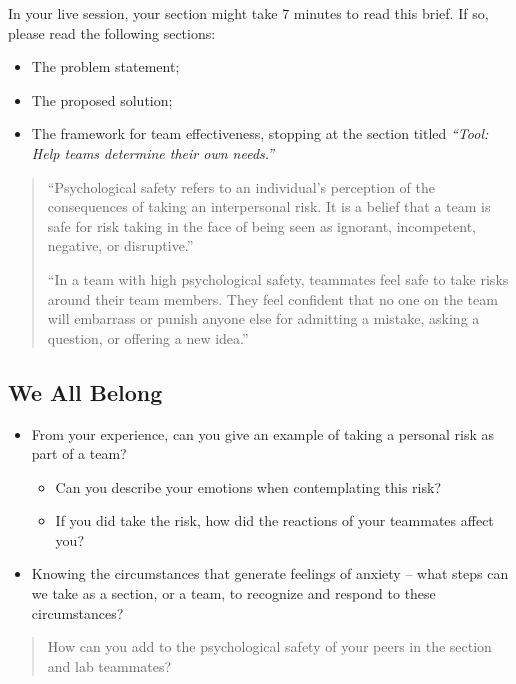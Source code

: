 \documentclass[
]{book}
\providecommand{\tightlist}{%
  \setlength{\itemsep}{0pt}\setlength{\parskip}{0pt}}
\theoremstyle{definition}
\theoremstyle{definition}
\theoremstyle{definition}
\theoremstyle{definition}
\theoremstyle{remark}
\begin{document}
In your live session, your section might take 7 minutes to read this brief. If so, please read the following sections:

\begin{itemize}
\tightlist
\item
  The problem statement;
\item
  The proposed solution;
\item
  The framework for team effectiveness, stopping at the section titled \emph{``Tool: Help teams determine their own needs.''}
\end{itemize}

\begin{quote}
``Psychological safety refers to an individual's perception of the consequences of taking an interpersonal risk. It is a belief that a team is safe for risk taking in the face of being seen as ignorant, incompetent, negative, or disruptive.''

``In a team with high psychological safety, teammates feel safe to take risks around their team members. They feel confident that no one on the team will embarrass or punish anyone else for admitting a mistake, asking a question, or offering a new idea.''
\end{quote}

\subsection{We All Belong}\label{we-all-belong}

\begin{itemize}
\tightlist
\item
  From your experience, can you give an example of taking a personal risk as part of a team?

  \begin{itemize}
  \tightlist
  \item
    Can you describe your emotions when contemplating this risk?
  \item
    If you did take the risk, how did the reactions of your teammates affect you?
  \end{itemize}
\item
  Knowing the circumstances that generate feelings of anxiety -- what steps can we take as a section, or a team, to recognize and respond to these circumstances?
\end{itemize}

\begin{quote}
How can you add to the psychological safety of your peers in the section and lab teammates?
\end{quote}
\end{document}
